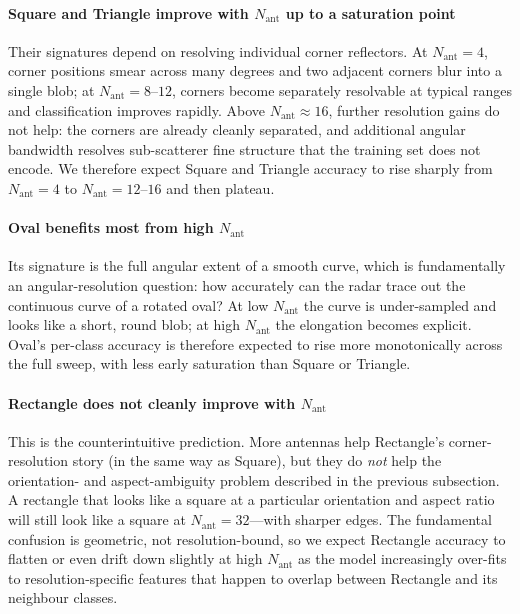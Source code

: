 \documentclass[letterpaper,11pt,leqno]{article}
\begin{document}
\paragraph{Square and Triangle improve with $N_{\mathrm{ant}}$ up to a saturation point} Their signatures depend on resolving individual corner reflectors. At $N_{\mathrm{ant}}=4$, corner positions smear across many degrees and two adjacent corners blur into a single blob; at $N_{\mathrm{ant}}=8$--$12$, corners become separately resolvable at typical ranges and classification improves rapidly. Above $N_{\mathrm{ant}}\approx 16$, further resolution gains do not help: the corners are already cleanly separated, and additional angular bandwidth resolves sub-scatterer fine structure that the training set does not encode. We therefore expect Square and Triangle accuracy to rise sharply from $N_{\mathrm{ant}}=4$ to $N_{\mathrm{ant}}=12$--$16$ and then plateau.

\paragraph{Oval benefits most from high $N_{\mathrm{ant}}$} Its signature is the full angular extent of a smooth curve, which is fundamentally an angular-resolution question: how accurately can the radar trace out the continuous curve of a rotated oval? At low $N_{\mathrm{ant}}$ the curve is under-sampled and looks like a short, round blob; at high $N_{\mathrm{ant}}$ the elongation becomes explicit. Oval's per-class accuracy is therefore expected to rise more monotonically across the full sweep, with less early saturation than Square or Triangle.

\paragraph{Rectangle does not cleanly improve with $N_{\mathrm{ant}}$} This is the counterintuitive prediction. More antennas help Rectangle's corner-resolution story (in the same way as Square), but they do \emph{not} help the orientation- and aspect-ambiguity problem described in the previous subsection. A rectangle that looks like a square at a particular orientation and aspect ratio will still look like a square at $N_{\mathrm{ant}}=32$---with sharper edges. The fundamental confusion is geometric, not resolution-bound, so we expect Rectangle accuracy to flatten or even drift down slightly at high $N_{\mathrm{ant}}$ as the model increasingly over-fits to resolution-specific features that happen to overlap between Rectangle and its neighbour classes.
\end{document}
